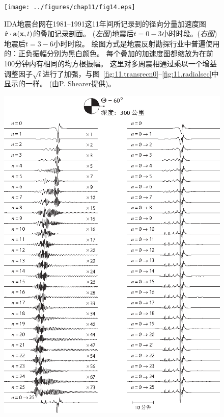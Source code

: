 \begin{figure}
\begin{center}
\scalebox{0.9}
{
\texttt{[image: ../figures/chap11/fig14.eps]}
}
\end{center}
\caption[Shearer stack]{
\label{fig:11.shearer}
IDA地震台网在1981--1991这11年间所记录到的径向分量加速度图$\hat{\bf r}\cdot{\bf a}({\bf x},t)$的叠加记录剖面。
({\em 左图\/})地震后$t=0\!-\!3$小时时段。({\em 右图\/})地震后$t=3\!-\!6$小时时段。
绘图方式是地震反射勘探行业中普遍使用的：正负振幅分别为黑白颜色。
每个叠加的加速度图都缩放为在前100分钟内有相同的均方根振幅。
这里对多周震相通过乘以一个增益调整因子$\sqrt{t}$进行了加强，与图~\ref{fig:11.transrecn0}--\ref{fig:11.radialsec}中显示的一样。
(由P. Shearer提供)。
}
\end{figure}
\begin{figure}
\begin{center}
\scalebox{0.9}
{
\includegraphics{../figures/chap11/fig15.eps}
}
\end{center}
\end{figure}
